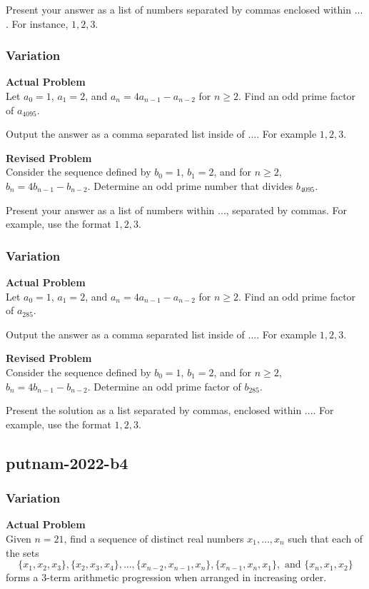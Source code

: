 Present your answer as a list of numbers separated by commas enclosed within $\boxed{...}$. For instance, $\boxed{1, 2, 3}$.

\subsubsection{Variation}
\textbf{Actual Problem}\\
Let $a_0=1$, $a_1=2$, and $a_n=4a_{n-1}-a_{n-2}$ for $n\geq 2$. Find an odd prime factor of $a_{4095}$.

Output the answer as a comma separated list inside of $\boxed{...}$. For example $\boxed{1, 2, 3}$.

\textbf{Revised Problem}\\
Consider the sequence defined by $b_0=1$, $b_1=2$, and for $n\geq 2$, $b_n=4b_{n-1}-b_{n-2}$. Determine an odd prime number that divides $b_{4095}$.

Present your answer as a list of numbers within $\boxed{...}$, separated by commas. For example, use the format $\boxed{1, 2, 3}$.

\subsubsection{Variation}
\textbf{Actual Problem}\\
Let $a_0=1$, $a_1=2$, and $a_n=4a_{n-1}-a_{n-2}$ for $n\geq 2$. Find an odd prime factor of $a_{285}$.

Output the answer as a comma separated list inside of $\boxed{...}$. For example $\boxed{1, 2, 3}$.

\textbf{Revised Problem}\\
Consider the sequence defined by $b_0 = 1$, $b_1 = 2$, and for $n \geq 2$, $b_n = 4b_{n-1} - b_{n-2}$. Determine an odd prime factor of $b_{285}$.

Present the solution as a list separated by commas, enclosed within $\boxed{...}$. For example, use the format $\boxed{1, 2, 3}$.

\subsection{putnam-2022-b4}
\subsubsection{Variation}
\textbf{Actual Problem}\\
Given $n = 21$, find a sequence of distinct real numbers $x_1, \ldots, x_n$ such that each of the sets$$\{x_1, x_2, x_3\}, \{x_2, x_3, x_4\},\ldots,\{x_{n-2}, x_{n-1}, x_n\}, \{x_{n-1}, x_n, x_1\},\text{ and } \{x_n, x_1, x_2\}$$ forms a 3-term arithmetic progression when arranged in increasing order.

